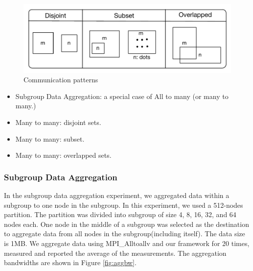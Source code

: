 \begin{figure}[!htb]
\vspace{-0.1in}
\centering
\includegraphics[scale=0.55]{figures/patterns.pdf}
\vspace{-0.1in}
\caption{Communication patterns}
\vspace{-0.1in}
\label{fig:patterns}
\end{figure}

\begin{itemize}
\item Subgroup Data Aggregation: a special case of All to many (or many to many.)
\item Many to many: disjoint sets.
\item Many to many: subset.
\item Many to many: overlapped sets.
\end{itemize}

\subsubsection{Subgroup Data Aggregation}

In the subgroup data aggregation experiment, we aggregated data within a subgroup to one node in the subgroup. In this experiment, we used a 512-nodes partition. The partition was divided into subgroup of size 4, 8, 16, 32, and 64 nodes each. One node in the middle of a subgroup was selected as the destination to aggregate data from all nodes in the subgroup(including itself). The data size is 1MB. We aggregate data using MPI\_Alltoallv and our framework for 20 times, measured and reported the average of the measurements. The aggregation bandwidths are shown in Figure \ref{fig:aggbw}.

